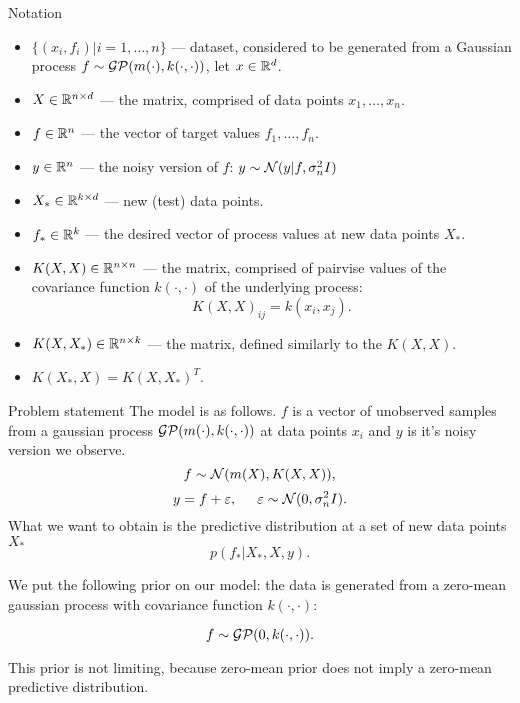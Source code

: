 \begin{frame}{Notation}
	\begin{itemize}
		\item $\{(x_i, f_i) | i = 1, \ldots, n\}$ — dataset, considered to be generated from a Gaussian process $f \sim \mathcal{GP}(m(\cdot), k(\cdot, \cdot))$, let $x \in \mathbb{R}^d$. 
		\item $X \in \mathbb{R}^{n \times d}$ — the matrix, comprised of data points $x_1, \ldots, x_n$.
		\item $f \in \mathbb{R}^n$ — the vector of target values $f_1, \ldots, f_n$.

		\item $y \in \mathbb{R}^n$ — the noisy version of $f$: $y \sim \mathcal{N}(y | f, \sigma_n^2 I)$

		\item $X_* \in \mathbb{R}^{k \times d}$ — new (test) data points.

		\item $f_* \in \mathbb{R}^k$ — the desired vector of process values at new data points $X_*$.

		\item $K(X, X) \in \mathbb{R}^{n \times n}$ — the matrix, comprised of pairvise values of the covariance function $k(\cdot, \cdot)$ of the underlying process:
		$$K(X, X)_{ij} = k(x_i, x_j).$$

		\item $K(X, X_*) \in \mathbb{R}^{n \times k}$ — the matrix, defined similarly to the $K(X, X)$.

		\item $K(X_*, X) = K(X, X_*)^T$.
	\end{itemize}

	
\end{frame}

\begin{frame}{Problem statement}
	The model is as follows. $f$ is a vector of unobserved samples from a gaussian process $\mathcal{GP}(m(\cdot), k(\cdot, \cdot))$ at data points $x_i$ and $y$ is it's noisy version we observe.
	$$f \sim \mathcal{N}(m(X), K(X, X)),$$
	$$y = f + \varepsilon, \hspace{0.5cm}\varepsilon \sim \mathcal{N}(0, \sigma_n^2 I).$$
	What we want to obtain is the predictive distribution at a set of new data points $X_*$
	$$p(f_* | X_*, X, y).$$

	We put the following prior on our model: the data is generated from a zero-mean gaussian process with covariance function $k(\cdot, \cdot)$:

	$$f \sim \mathcal{GP}(0, k(\cdot, \cdot)).$$

	This prior is not limiting, because zero-mean prior does not imply a zero-mean predictive distribution.

\end{frame}

